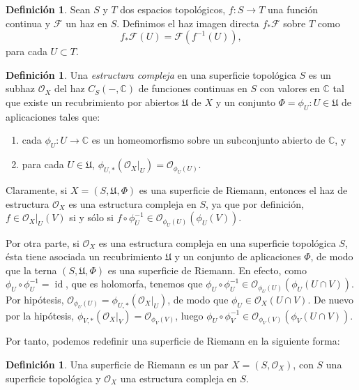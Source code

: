 \documentclass[autocontact]{gaceta}
\theoremstyle{definition} \newtheorem{defn}[thm]{Definición}
\theoremstyle{definition} \newtheorem{ejemplo}[thm]{Ejemplo}
\theoremstyle{definition} \newtheorem{ejercicio}[thm]{Ejercicio}
\def\CC{\mathbb{C}}
\def\OO{\mathscr{O}}
\DeclareMathOperator{\id}{id}
\begin{document}
\begin{defn}
  Sean $S$ y $T$ dos espacios topológicos, $f:S\rightarrow T$ una función continua y $\mathscr{F}$ un haz en $S$. Definimos el haz imagen directa $f_*\mathscr{F}$ sobre $T$ como 
  \begin{equation*}
    f_*\mathscr{F}(U)=\mathscr{F}(f^{-1}(U)),
  \end{equation*}
  para cada $U\subset T$.
\end{defn}

\begin{defn}
  Una \emph{estructura compleja} en una superficie topológica $S$ es un subhaz $\OO_X$ del haz $C_S(-,\CC)$ de funciones continuas en $S$ con valores en $\CC$ tal que existe un recubrimiento por abiertos $\mathfrak{U}$ de $X$ y un conjunto $\Phi={\phi_U:U\in \mathfrak{U}}$ de aplicaciones tales que:
  \begin{enumerate}
    \item cada $\phi_U:U\rightarrow \CC$ es un homeomorfismo sobre un subconjunto abierto de $\CC$, y
    \item para cada $U\in \mathfrak{U}$, $\phi_{U,*}(\OO_X|_U)= \OO_{\phi_U(U)}$.
  \end{enumerate}
\end{defn}

Claramente, si $X=(S,\mathfrak{U},\Phi)$ es una superficie de Riemann, entonces el haz de estructura $\OO_X$ es una estructura compleja en $S$, ya que por definición, $f\in \OO_X|_U(V)$ si y sólo si $f\circ \phi_U^{-1} \in \OO_{\phi_U(U)}(\phi_U(V))$.

Por otra parte, si $\OO_X$ es una estructura compleja en una superficie topológica $S$, ésta tiene asociada un recubrimiento $\mathfrak{U}$ y un conjunto de aplicaciones $\Phi$, de modo que la terna $(S,\mathfrak{U},\Phi)$ es una superficie de Riemann. En efecto, como $\phi_U \circ \phi_U^{-1}=\id$, que es holomorfa, tenemos que $\phi_U \circ \phi_U^{-1} \in \OO_{\phi_U(U)}(\phi_U(U\cap V))$. Por hipótesis, $\OO_{\phi_U(U)} = \phi_{U,*}(\OO_X|_U)$, de modo que $\phi_U \in \OO_X(U\cap V)$. De nuevo por la hipótesis, $\phi_{V,*}(\OO_X|_V) = \OO_{\phi_V(V)}$, luego $\phi_U \circ \phi_V^{-1} \in \OO_{\phi_V(V)}(\phi_V(U\cap V))$.

Por tanto, podemos redefinir una superficie de Riemann en la siguiente forma:

\begin{defn}
  Una superficie de Riemann es un par $X=(S,\OO_X)$, con $S$ una superficie topológica y $\OO_X$ una estructura compleja en $S$.
\end{defn}
\end{document}
